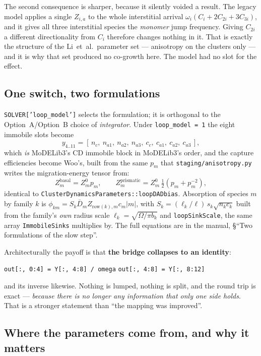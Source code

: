 \documentclass[11pt,a4paper]{article}
\newcommand{\code}[1]{\texttt{\small #1}}
\begin{document}
The second consequence is sharper, because it silently voided a result. The
legacy model applies a single $Z_{i,a}$ to the whole interstitial arrival
$\omega_i(C_i + 2C_{2i} + 3C_{3i})$, and it gives all three interstitial
species the \emph{monomer} jump frequency. Giving $C_{2i}$ a different
directionality from $C_i$ therefore changes nothing in it. That is exactly the
structure of the Li~et~al.\ parameter set --- anisotropy on the clusters only
--- and it is why that set produced no co-growth here. The model had no slot
for the effect.

\subsection{One switch, two formulations}

\code{SOLVER['loop\_model']} selects the formulation; it is orthogonal to the
Option~A/Option~B choice of \emph{integrator}. Under \code{loop\_model = 1} the
eight immobile slots become
%
\[
  y_{4..11} = [\,n_c,\ n_{a1},\ n_{a2},\ n_{a3},\
                 c_c,\ c_{a1},\ c_{a2},\ c_{a3}\,],
\]
%
which \emph{is} MoDELib3's CD immobile block in MoDELib3's order, and the capture
efficiencies become Woo's, built from the same $p_m$ that
\code{staging/anisotropy.py} writes the migration-energy tensor from:
%
\[
  Z^{\text{basal}}_{m} = Z^{0}_{m} p_m, \qquad
  Z^{\text{prismatic}}_{m} = Z^{0}_{m}\,\tfrac12\!\left(p_m + p_m^{-2}\right),
\]
%
identical to \code{ClusterDynamicsParameters::loopDADbias}. Absorption of
species $m$ by family $k$ is
$\phi_{km} = S_k \bar{D}_m Z_{\mathrm{row}(k),m} c_m |m|$, with
$S_k = (\ell_k/\ell)\,s_k\sqrt{n_k c_k}$ built from the family's \emph{own}
radius scale $\ell_k = \sqrt{\Omega/\pi b_k}$ and \code{loopSinkScale}, the same
array \code{ImmobileSinks} multiplies by. The full equations are in the manual,
\S``Two formulations of the slow step''.

Architecturally the payoff is that \textbf{the bridge collapses to an
identity}:
%
\begin{center}
\code{out[:, 0:4] = Y[:, 4:8] / omega} \qquad
\code{out[:, 4:8] = Y[:, 8:12]}
\end{center}
%
and its inverse likewise. Nothing is lumped, nothing is split, and the round
trip is exact --- \emph{because there is no longer any information that only one
side holds}. That is a stronger statement than ``the mapping was improved''.

\subsection{Where the parameters come from, and why it matters}
\end{document}
